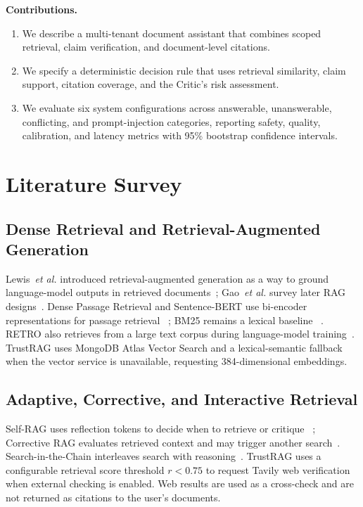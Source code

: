 \documentclass[conference]{IEEEtran}
\begin{document}
\textbf{Contributions.}
\begin{enumerate}
  \item We describe a multi-tenant document assistant that combines scoped
    retrieval, claim verification, and document-level citations.
  \item We specify a deterministic decision rule that uses retrieval similarity,
    claim support, citation coverage, and the Critic's risk assessment.
  \item We evaluate six system configurations across answerable, unanswerable,
    conflicting, and prompt-injection categories, reporting safety, quality,
    calibration, and latency metrics with 95\% bootstrap confidence intervals.
\end{enumerate}

\section{Literature Survey}
\label{sec:related}

\subsection{Dense Retrieval and Retrieval-Augmented Generation}
Lewis~\emph{et al.} introduced retrieval-augmented generation as a way to ground
language-model outputs in retrieved documents~\cite{lewis2020rag}; Gao~\emph{et al.}
survey later RAG designs~\cite{gao2023rag}. Dense Passage Retrieval and
Sentence-BERT use bi-encoder representations for passage retrieval
~\cite{karpukhin2020dpr,reimers2019sentencebert}; BM25 remains a lexical baseline
~\cite{robertson2009probabilistic}. RETRO also retrieves from a large text corpus
during language-model training~\cite{borgeaud2022retro}. TrustRAG uses MongoDB
Atlas Vector Search and a lexical-semantic fallback when the vector service is
unavailable, requesting 384-dimensional embeddings.

\subsection{Adaptive, Corrective, and Interactive Retrieval}
Self-RAG uses reflection tokens to decide when to retrieve or critique
~\cite{asai2024selfrag}; Corrective RAG evaluates retrieved context and may
trigger another search~\cite{yan2024crag}. Search-in-the-Chain interleaves search
with reasoning~\cite{xu2024search}. TrustRAG uses a configurable retrieval score
threshold $r < 0.75$ to request Tavily web verification when external checking is
enabled. Web results are used as a cross-check and are not returned as citations
to the user's documents.
\end{document}
